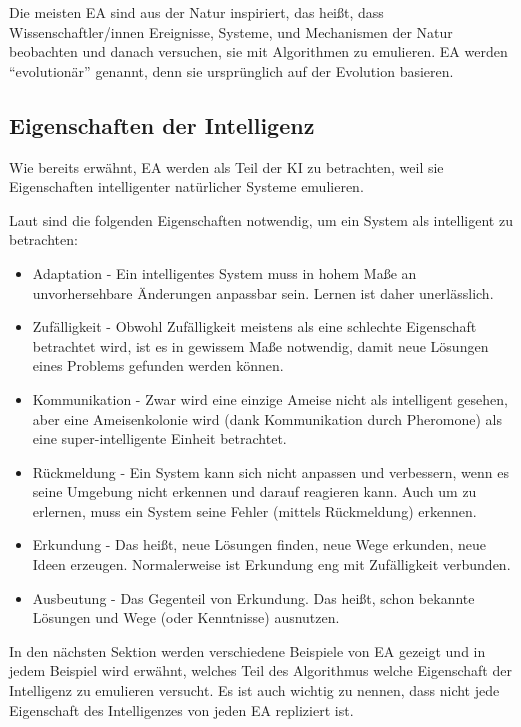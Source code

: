 \documentclass[twoside,twocolumn]{article}
\begin{document}
Die meisten EA sind aus der Natur inspiriert, das heißt, dass Wissenschaftler/innen Ereignisse, Systeme, und Mechanismen der Natur beobachten und danach versuchen, sie mit Algorithmen zu emulieren. EA werden \enquote{evolutionär} genannt, denn sie ursprünglich auf der Evolution basieren. \cite{holland_ga}

\subsection{Eigenschaften der Intelligenz}
Wie bereits erwähnt, EA werden als Teil der KI zu betrachten, weil sie Eigenschaften intelligenter natürlicher Systeme emulieren.\par
Laut \cite{wiley_evolutionary} sind die folgenden Eigenschaften notwendig, um ein System als intelligent zu betrachten:

\begin{itemize}
\item{Adaptation - Ein intelligentes System muss in hohem Maße an unvorhersehbare Änderungen anpassbar sein. Lernen ist daher unerlässlich.}
\item{Zufälligkeit - Obwohl Zufälligkeit meistens als eine schlechte Eigenschaft betrachtet wird, ist es in gewissem Maße notwendig, damit neue Lösungen eines Problems gefunden werden können.}
\item{Kommunikation -  Zwar wird eine einzige Ameise nicht als intelligent gesehen, aber eine Ameisenkolonie wird (dank Kommunikation durch Pheromone) als eine super-intelligente Einheit betrachtet.}
\item{Rückmeldung - Ein System kann sich nicht anpassen und verbessern, wenn es seine Umgebung nicht erkennen und darauf reagieren kann. Auch um zu erlernen, muss ein System seine Fehler (mittels Rückmeldung) erkennen.}
\item{Erkundung - Das heißt, neue Lösungen finden, neue Wege erkunden, neue Ideen erzeugen. Normalerweise ist Erkundung eng mit Zufälligkeit verbunden.}
\item{Ausbeutung - Das Gegenteil von Erkundung. Das heißt, schon bekannte Lösungen und Wege (oder Kenntnisse) ausnutzen.}
\end{itemize}

In den nächsten Sektion werden verschiedene Beispiele von EA gezeigt und in jedem Beispiel wird erwähnt, welches Teil des Algorithmus welche Eigenschaft der Intelligenz  zu emulieren versucht. Es ist auch wichtig zu nennen, dass nicht jede Eigenschaft des Intelligenzes von jeden EA repliziert ist.
\end{document}
